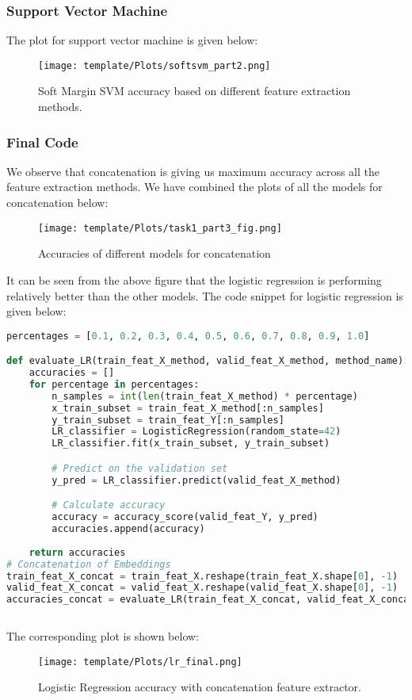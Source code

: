 \documentclass{article} %
\begin{document}
\subsubsection{Support Vector Machine}
The plot for support vector machine is given below:
\begin{figure}[htbp]
    \centering
    \texttt{[image: template/Plots/softsvm\_part2.png]}
    \caption{Soft Margin SVM accuracy based on different feature extraction methods.}
    \label{fig:6}
\end{figure}
\subsubsection{Final Code}
We observe that concatenation is giving us maximum accuracy across all the feature extraction methods. We have combined the plots of all the models for concatenation below:

\begin{figure}[htbp]
    \centering
    \texttt{[image: template/Plots/task1\_part3\_fig.png]}
    \caption{Accuracies of different models for concatenation}
    \label{fig:7}
\end{figure}
It can be seen from the above figure that the logistic regression is performing relatively better than the other models. The code snippet for logistic regression is given below:

\begin{lstlisting}[language=Python]
percentages = [0.1, 0.2, 0.3, 0.4, 0.5, 0.6, 0.7, 0.8, 0.9, 1.0]

def evaluate_LR(train_feat_X_method, valid_feat_X_method, method_name):
    accuracies = []
    for percentage in percentages:
        n_samples = int(len(train_feat_X_method) * percentage)
        x_train_subset = train_feat_X_method[:n_samples]
        y_train_subset = train_feat_Y[:n_samples]
        LR_classifier = LogisticRegression(random_state=42)
        LR_classifier.fit(x_train_subset, y_train_subset)

        # Predict on the validation set
        y_pred = LR_classifier.predict(valid_feat_X_method)

        # Calculate accuracy
        accuracy = accuracy_score(valid_feat_Y, y_pred)
        accuracies.append(accuracy)
    
    return accuracies
# Concatenation of Embeddings
train_feat_X_concat = train_feat_X.reshape(train_feat_X.shape[0], -1)
valid_feat_X_concat = valid_feat_X.reshape(valid_feat_X.shape[0], -1)
accuracies_concat = evaluate_LR(train_feat_X_concat, valid_feat_X_concat, "Concatenation")
    
\end{lstlisting}
The corresponding plot is shown below: 
\begin{figure}[htbp]
    \centering
    \texttt{[image: template/Plots/lr\_final.png]}
    \caption{Logistic Regression accuracy with concatenation feature extractor.}
    \label{fig:8}
\end{figure}
\end{document}
